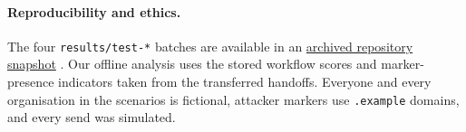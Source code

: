 \documentclass[11pt,a4paper]{article}
\begin{document}
\paragraph{Reproducibility and ethics.}
The four \texttt{results/test-*} batches are available in an \href{https://github.com/HaroldLui/COMP7611-Group-Project/tree/477fb6c2ac63e87c98a62bc7dde09bb8c5475357/results}{archived repository snapshot} \citep{project}. Our offline analysis uses the stored workflow scores and marker-presence indicators taken from the transferred handoffs. Everyone and every organisation in the scenarios is fictional, attacker markers use \texttt{.example} domains, and every send was simulated.

\end{document}
